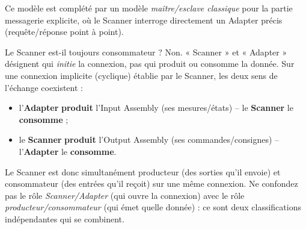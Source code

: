 Ce modèle est complété par un modèle \emph{maître/esclave classique} pour la partie messagerie explicite, où le Scanner interroge directement un Adapter précis (requête/réponse point à point).

\begin{UPSTIwarning}{Le Scanner est-il toujours consommateur ?}
    Non. « Scanner » et « Adapter » désignent qui \emph{initie} la connexion, pas qui produit ou consomme la donnée. Sur une connexion implicite (cyclique) établie par le Scanner, les deux sens de l'échange coexistent :
    \begin{itemize}
        \item l'\textbf{Adapter} \textbf{produit} l'Input Assembly (ses mesures/états) -- le \textbf{Scanner} le \textbf{consomme} ;
        \item le \textbf{Scanner} \textbf{produit} l'Output Assembly (ses commandes/consignes) -- l'\textbf{Adapter} le \textbf{consomme}.
    \end{itemize}
    Le Scanner est donc simultanément producteur (des sorties qu'il envoie) et consommateur (des entrées qu'il reçoit) sur une même connexion. Ne confondez pas le rôle \emph{Scanner/Adapter} (qui ouvre la connexion) avec le rôle \emph{producteur/consommateur} (qui émet quelle donnée) : ce sont deux classifications indépendantes qui se combinent.
\end{UPSTIwarning}
